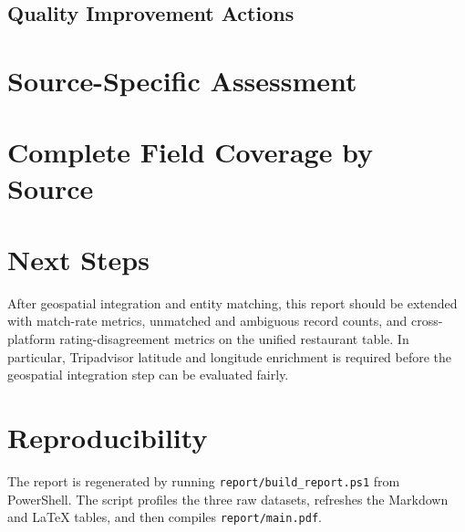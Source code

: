 
\subsection{Quality Improvement Actions}


\section{Source-Specific Assessment}




\section{Complete Field Coverage by Source}




\section{Next Steps}

After geospatial integration and entity matching, this report should be extended
with match-rate metrics, unmatched and ambiguous record counts, and
cross-platform rating-disagreement metrics on the unified restaurant table. In
particular, Tripadvisor latitude and longitude enrichment is required before the
geospatial integration step can be evaluated fairly.

\section{Reproducibility}

The report is regenerated by running \texttt{report/build\_report.ps1} from
PowerShell. The script profiles the three raw datasets, refreshes the Markdown
and LaTeX tables, and then compiles \texttt{report/main.pdf}.
